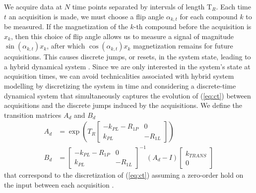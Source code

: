 \documentclass{article}
\begin{document}
We acquire data at $N$ time points separated by intervals of length T$_R$. 
Each time $t$ an acquisition is made, we must choose a flip angle $\alpha_{k, t}$ for each compound $k$ to be
measured. If the magnetization of the $k$-th compound before the acquisition is $x_k$, then this choice of flip
angle allows us to measure a signal of magnitude $\sin(\alpha_{k, t}) x_k$, after which $\cos(\alpha_{k, t}) x_k$ magnetization
remains for future acquisitions. This causes discrete jumps, or resets, in the system state, leading to a hybrid dynamical system \cite{Lygeros08,Goebel12}. Since we are only interested in the system's state at acquisition times, we can avoid technicalities associated with hybrid system modelling by discretizing the system in time and considering a discrete-time dynamical system that simultaneously captures the  evolution of (\ref{eq:ct}) between acquisitions and the discrete jumps induced by the acquisitions. 
We define the transition matrices $A_d$ and $B_d$
\begin{equation*}
\begin{split}
  A_d &= \exp\left( T_R  \left[ \begin{array}{cc}
    -k_{PL} - R_{1P} & 0           \\ 
     k_{PL}                & -R_{1L} \end{array} \right] \right) \\
  B_d &= \left[ \begin{array}{cc}
    -k_{PL} - R_{1P} & 0           \\ 
     k_{PL}                & -R_{1L} \end{array} \right]^{-1}(A_d- I)   \left[ \begin{array}{c} k_{TRANS} \\ 0 \end{array} \right]
  \end{split}
\end{equation*}
that correspond to the discretization of (\ref{eq:ct}) assuming a zero-order hold on the input between each acquisition \cite{Chen98}.  
\end{document}
